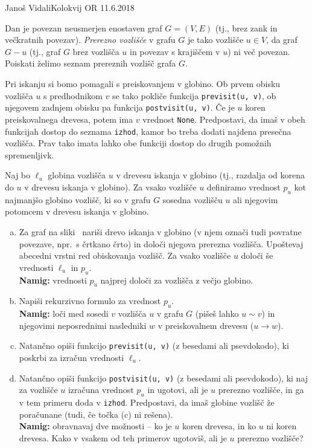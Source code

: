 \begin{naloga}{Janoš Vidali}{Kolokvij OR 11.6.2018}
\begin{vprasanje}[prerezna]
Dan je povezan neusmerjen enostaven graf $G = (V, E)$
(tj., brez zank in večkratnih povezav).
{\em Prerezno vozlišče} v grafu $G$ je tako vozlišče $u \in V$,
da graf $G - u$
(tj., graf $G$ brez vozlišča $u$ in povezav s krajiščem v $u$)
ni več povezan.
Poiskati želimo seznam prereznih vozlišč grafa $G$.

Pri iskanju si bomo pomagali s preiskovanjem v globino.
Ob prvem obisku vozlišča $u$ s predhodnikom $v$
se tako pokliče funkcija \verb|previsit(u, v)|,
ob njegovem zadnjem obisku pa funkcija \verb|postvisit(u, v)|.
Če je $u$ koren preiskovalnega drevesa, potem ima $v$ vrednost \verb|None|.
Predpostavi, da imaš v obeh funkcijah dostop do seznama \verb|izhod|,
kamor bo treba dodati najdena presečna vozlišča.
Prav tako imata lahko obe funkciji dostop do drugih pomožnih spremenljivk.

Naj bo $\ell_u$ globina vozlišča $u$ v drevesu iskanja v globino
(tj., razdalja od korena do $u$ v drevesu iskanja v globino).
Za vsako vozlišče $u$ definiramo vrednost $p_u$ kot najmanjšo globino vozlišč,
ki so v grafu $G$ sosedna vozlišču $u$
ali njegovim potomcem v drevesu iskanja v globino.

\begin{enumerate}[(a)]
\item Za graf na sliki~\fig{} nariši drevo iskanja v globino
(v njem označi tudi povratne povezave, npr.~s črtkano črto)
in določi njegova prerezna vozlišča.
Upoštevaj abecedni vrstni red obiskovanja vozlišč.
Za vsako vozlišče $u$ določi še vrednosti $\ell_u$ in $p_u$. \\
{\small {\bf Namig:}
vrednosti $p_u$ najprej določi za vozlišča z večjo globino.}

\item Napiši rekurzivno formulo za vrednost $p_u$. \\
{\small {\bf Namig:} loči med sosedi $v$ vozlišča $u$ v grafu $G$
(pišeš lahko $u \sim v$)
in njegovimi neposrednimi nasledniki $w$ v preiskovalnem drevesu ($u \to w$).}

\item Natančno opiši funkcijo \verb|previsit(u, v)|
(z besedami ali psevdokodo),
ki poskrbi za izračun vrednosti $\ell_u$.

\item Natančno opiši funkcijo \verb|postvisit(u, v)|
(z besedami ali psevdokodo),
ki naj za vozlišče $u$ izračuna vrednost $p_u$ in ugotovi,
ali je $u$ prerezno vozlišče, in ga v tem primeru doda v \verb|izhod|.
Predpostavi, da imaš globine vozlišč že poračunane
(tudi, če točka (c) ni rešena). \\
{\small {\bf Namig:} obravnavaj dve možnosti --
ko je $u$ koren drevesa, in ko $u$ ni koren drevesa.
Kako v vsakem od teh primerov ugotoviš, ali je $u$ prerezno vozlišče?}


\end{enumerate}
\end{vprasanje}
\end{naloga}
